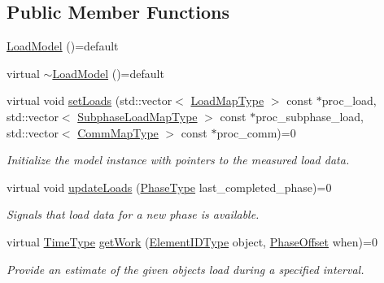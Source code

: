 \subsection*{Public Member Functions}
\begin{DoxyCompactItemize}
\item 
\hyperlink{classvt_1_1vrt_1_1collection_1_1balance_1_1_load_model_a90f345e752441d66b2893027f2626226}{Load\+Model} ()=default
\item 
virtual \hyperlink{classvt_1_1vrt_1_1collection_1_1balance_1_1_load_model_a6478a387f285b322a48ee1d8a80fc6f7}{$\sim$\+Load\+Model} ()=default
\item 
virtual void \hyperlink{classvt_1_1vrt_1_1collection_1_1balance_1_1_load_model_a5a567ca5a78f82e79d846c0b2ddbd07a}{set\+Loads} (std\+::vector$<$ \hyperlink{namespacevt_1_1vrt_1_1collection_1_1balance_a45306ee4bf38fe3fb586d1ee2fa3d147}{Load\+Map\+Type} $>$ const $\ast$proc\+\_\+load, std\+::vector$<$ \hyperlink{namespacevt_1_1vrt_1_1collection_1_1balance_a3d91523158c1025b7b665240072f3b7e}{Subphase\+Load\+Map\+Type} $>$ const $\ast$proc\+\_\+subphase\+\_\+load, std\+::vector$<$ \hyperlink{namespacevt_1_1vrt_1_1collection_1_1balance_a10860c956804d644db54a16012352728}{Comm\+Map\+Type} $>$ const $\ast$proc\+\_\+comm)=0
\begin{DoxyCompactList}\small\item\em Initialize the model instance with pointers to the measured load data. \end{DoxyCompactList}\item 
virtual void \hyperlink{classvt_1_1vrt_1_1collection_1_1balance_1_1_load_model_a4f1c6fb5d7d7a0b147755f025b1d5f5c}{update\+Loads} (\hyperlink{namespacevt_a46ce6733d5cdbd735d561b7b4029f6d7}{Phase\+Type} last\+\_\+completed\+\_\+phase)=0
\begin{DoxyCompactList}\small\item\em Signals that load data for a new phase is available. \end{DoxyCompactList}\item 
virtual \hyperlink{namespacevt_a876a9d0cd5a952859c72de8a46881442}{Time\+Type} \hyperlink{classvt_1_1vrt_1_1collection_1_1balance_1_1_load_model_ab51ce15ff1ff1341ba921555d4d57159}{get\+Work} (\hyperlink{namespacevt_1_1vrt_1_1collection_1_1balance_a14c8d2c972f2913aa3f1636e5be0a120}{Element\+I\+D\+Type} object, \hyperlink{structvt_1_1vrt_1_1collection_1_1balance_1_1_phase_offset}{Phase\+Offset} when)=0
\begin{DoxyCompactList}\small\item\em Provide an estimate of the given object\textquotesingle{}s load during a specified interval. \end{DoxyCompactList}\item 

\end{DoxyCompactItemize}
